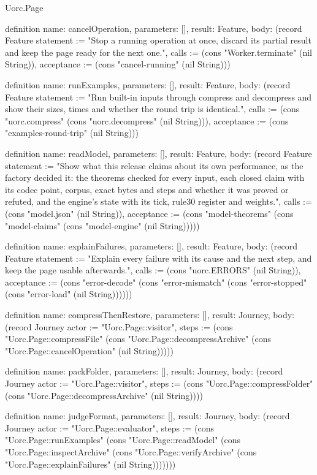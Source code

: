 \begin{lexlean}{Uorc.Page}
\begin{semanticmodule}
definition{
  name: cancelOperation,
  parameters: [],
  result: Feature,
  body: (record Feature {statement := "Stop a running operation at once, discard its partial result and keep the page ready for the next one.", calls := (cons "Worker.terminate" (nil String)), acceptance := (cons "cancel-running" (nil String))})
}

definition{
  name: runExamples,
  parameters: [],
  result: Feature,
  body: (record Feature {statement := "Run built-in inputs through compress and decompress and show their sizes, times and whether the round trip is identical.", calls := (cons "uorc.compress" (cons "uorc.decompress" (nil String))), acceptance := (cons "examples-round-trip" (nil String))})
}

definition{
  name: readModel,
  parameters: [],
  result: Feature,
  body: (record Feature {statement := "Show what this release claims about its own performance, as the factory decided it: the theorems checked for every input, each closed claim with its codec point, corpus, exact bytes and steps and whether it was proved or refuted, and the engine's state with its tick, rule30 register and weights.", calls := (cons "model.json" (nil String)), acceptance := (cons "model-theorems" (cons "model-claims" (cons "model-engine" (nil String))))})
}

definition{
  name: explainFailures,
  parameters: [],
  result: Feature,
  body: (record Feature {statement := "Explain every failure with its cause and the next step, and keep the page usable afterwards.", calls := (cons "uorc.ERRORS" (nil String)), acceptance := (cons "error-decode" (cons "error-mismatch" (cons "error-stopped" (cons "error-load" (nil String)))))})
}

definition{
  name: compressThenRestore,
  parameters: [],
  result: Journey,
  body: (record Journey {actor := "Uorc.Page::visitor", steps := (cons "Uorc.Page::compressFile" (cons "Uorc.Page::decompressArchive" (cons "Uorc.Page::cancelOperation" (nil String))))})
}

definition{
  name: packFolder,
  parameters: [],
  result: Journey,
  body: (record Journey {actor := "Uorc.Page::visitor", steps := (cons "Uorc.Page::compressFolder" (cons "Uorc.Page::decompressArchive" (nil String)))})
}

definition{
  name: judgeFormat,
  parameters: [],
  result: Journey,
  body: (record Journey {actor := "Uorc.Page::evaluator", steps := (cons "Uorc.Page::runExamples" (cons "Uorc.Page::readModel" (cons "Uorc.Page::inspectArchive" (cons "Uorc.Page::verifyArchive" (cons "Uorc.Page::explainFailures" (nil String))))))})
}


\end{semanticmodule}
\end{lexlean}

